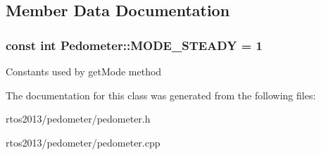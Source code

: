 \subsection{Member Data Documentation}
\hypertarget{classPedometer_a27aa2aacbeef562588658b858085c930}{
\subsubsection[{M\+O\+D\+E\+\_\+\+S\+T\+E\+A\+D\+Y}]{\setlength{\rightskip}{0pt plus 5cm}const int Pedometer\+::\+M\+O\+D\+E\+\_\+\+S\+T\+E\+A\+D\+Y = 1\hspace{0.3cm}{\ttfamily [static]}}}\label{classPedometer_a27aa2aacbeef562588658b858085c930}
Constants used by get\+Mode method 

The documentation for this class was generated from the following files\+:\begin{DoxyCompactItemize}
\item 
rtos2013/pedometer/pedometer.\+h\item 
rtos2013/pedometer/pedometer.\+cpp\end{DoxyCompactItemize}
